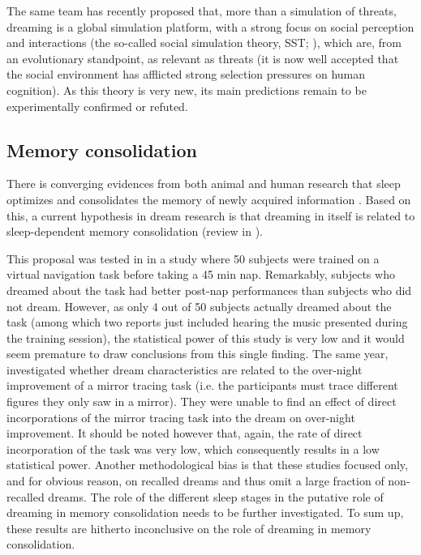The same team has recently proposed that, more than a simulation of threats, dreaming is a global simulation platform, with a strong focus on social perception and interactions (the so-called social simulation theory, SST; \citealp{revonsuo_avatars_2015}), which are, from an evolutionary standpoint, as relevant as threats (it is now well accepted that the social environment has afflicted strong selection pressures on human cognition). As this theory is very new, its main predictions remain to be experimentally confirmed or refuted.

\subsection{Memory consolidation}
\label{sec:dream-func:modern:memory}

There is converging evidences from both animal and human research that sleep optimizes and consolidates the memory of newly acquired information \citep{rasch_odor_2007, diekelmann_memory_2010}. Based on this, a current hypothesis in dream research is that dreaming in itself is related to sleep-dependent memory consolidation (review in \citealp{schredl_is_2017}).

This proposal was tested in \citet{wamsley_dreaming_2010} in a study where 50 subjects were trained on a virtual navigation task before taking a 45 min nap. Remarkably, subjects who dreamed about the task had better post-nap performances than subjects who did not dream. However, as only 4 out of 50 subjects actually dreamed about the task (among which two reports just included hearing the music presented during the training session), the statistical power of this study is very low and it would seem premature to draw conclusions from this single finding. The same year, \citet{schredl_is_2010} investigated whether dream characteristics are related to the over-night improvement of a mirror tracing task (i.e. the participants must trace different figures they only saw in a mirror). They were unable to find an effect of direct incorporations of the mirror tracing task into the dream on over-night improvement. It should be noted however that, again, the rate of direct incorporation of the task was very low, which consequently results in a low statistical power. Another methodological bias is that these studies focused only, and for obvious reason, on recalled dreams and thus omit a large fraction of non-recalled dreams. The role of the different sleep stages in the putative role of dreaming in memory consolidation needs to be further investigated. To sum up, these results are hitherto inconclusive on the role of dreaming in memory consolidation.

